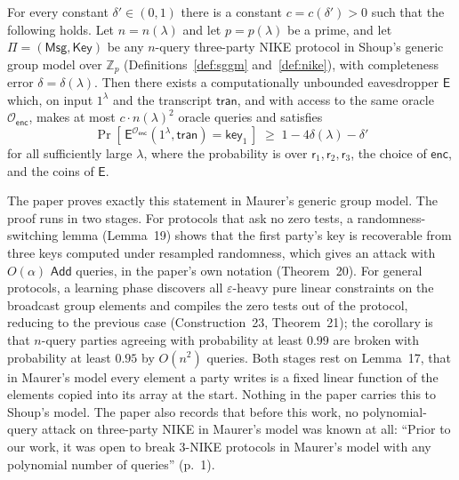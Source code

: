 \documentclass{aicr-conjecture}
\newcommand{\Zp}{\mathbb{Z}_{p}}
\newcommand{\enc}{\mathsf{enc}}
\newcommand{\Add}{\mathsf{Add}}
\newcommand{\Oenc}{\mathcal{O}_{\enc}}
\newcommand{\Msg}{\mathsf{Msg}}
\newcommand{\Key}{\mathsf{Key}}
\newcommand{\tran}{\mathsf{tran}}
\newcommand{\keyv}{\mathsf{key}}
\newcommand{\rv}{\mathsf{r}}
\newcommand{\Ev}{\mathsf{E}}
\begin{document}
\begin{conjecture}\label{conj:main}
For every constant $\delta' \in (0,1)$ there is a constant
$c = c(\delta') > 0$ such that the following holds. Let $n = n(\lambda)$
and let $p = p(\lambda)$ be a prime, and let $\Pi = (\Msg, \Key)$ be any
$n$-query three-party NIKE protocol in Shoup's generic group model over
$\Zp$ (Definitions~\ref{def:sggm} and~\ref{def:nike}), with completeness
error $\delta = \delta(\lambda)$. Then there exists a computationally
unbounded eavesdropper $\Ev$ which, on input $1^{\lambda}$ and the
transcript $\tran$, and with access to the same oracle $\Oenc$, makes at
most $c \cdot n(\lambda)^{2}$ oracle queries and satisfies
\[
  \Pr\!\left[\, \Ev^{\Oenc}(1^{\lambda}, \tran) = \keyv_{1} \,\right]
  \;\ge\; 1 - 4\delta(\lambda) - \delta'
\]
for all sufficiently large $\lambda$, where the probability is over
$\rv_{1}, \rv_{2}, \rv_{3}$, the choice of $\enc$, and the coins
of $\Ev$.
\end{conjecture}

\begin{remark}\label{rem:progress}
The paper proves exactly this statement in Maurer's generic group model.
The proof runs in two stages. For protocols that ask no zero tests, a
randomness-switching lemma (Lemma~19) shows that the first party's key
is recoverable from three keys computed under resampled randomness,
which gives an attack with $O(\alpha)$ $\Add$ queries, in the paper's
own notation (Theorem~20). For general protocols, a learning phase
discovers all $\varepsilon$-heavy pure linear constraints on the
broadcast group elements and compiles the zero tests out of the
protocol, reducing to the previous case (Construction~23,
Theorem~21); the corollary is that
$n$-query parties agreeing with probability at least $0.99$ are broken
with probability at least $0.95$ by $O(n^{2})$ queries. Both stages rest
on Lemma~17, that in Maurer's model every element a party writes is a
fixed linear function of the elements copied into its array at the
start. Nothing in the paper carries this to Shoup's model. The paper
also records that before this work, no polynomial-query attack on
three-party NIKE in Maurer's model was known at all: ``Prior to our
work, it was open to break 3-NIKE protocols in Maurer's model with any
polynomial number of queries'' (p.~1).
\end{remark}
\end{document}
